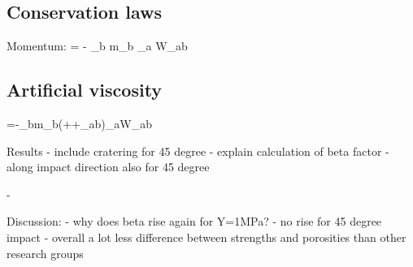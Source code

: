 \subsection{Conservation laws}
Momentum:
 = -  \sum \limits_{b} m_{b}  \nabla_{a} W_{ab}

\subsection{Artificial viscosity}

{=-\sum \limits _{b}m_{b}\left({}+{}+\Pi _{ab}\right)\nabla _{a}W_{ab}}


Results
- include cratering for 45 degree
- explain calculation of beta factor
- along impact direction also for 45 degree

-

Discussion:
- why does beta rise again for Y=1MPa?
- no rise for 45 degree impact
- overall a lot less difference between strengths and porosities than other research groups
